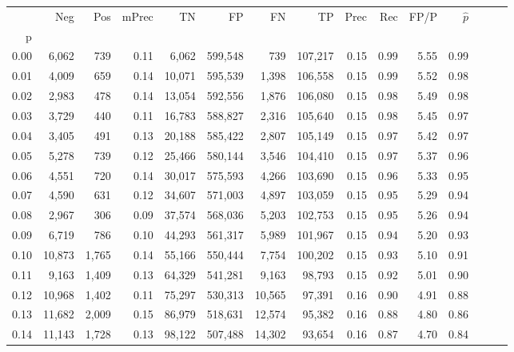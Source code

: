 \begin{tabular}{rrrrrrrrrrrrrrr}
\toprule
{} &     Neg &    Pos & mPrec &       TN &       FP &       FN &       TP &  Prec &   Rec &  FP/P & $\hat{p}$ \\
p    &         &        &       &          &          &          &          &       &       &       &           \\
\midrule
0.00 &   6,062 &    739 &  0.11 &    6,062 &  599,548 &      739 &  107,217 &  0.15 &  0.99 &  5.55 &      0.99 \\
0.01 &   4,009 &    659 &  0.14 &   10,071 &  595,539 &    1,398 &  106,558 &  0.15 &  0.99 &  5.52 &      0.98 \\
0.02 &   2,983 &    478 &  0.14 &   13,054 &  592,556 &    1,876 &  106,080 &  0.15 &  0.98 &  5.49 &      0.98 \\
0.03 &   3,729 &    440 &  0.11 &   16,783 &  588,827 &    2,316 &  105,640 &  0.15 &  0.98 &  5.45 &      0.97 \\
0.04 &   3,405 &    491 &  0.13 &   20,188 &  585,422 &    2,807 &  105,149 &  0.15 &  0.97 &  5.42 &      0.97 \\
0.05 &   5,278 &    739 &  0.12 &   25,466 &  580,144 &    3,546 &  104,410 &  0.15 &  0.97 &  5.37 &      0.96 \\
0.06 &   4,551 &    720 &  0.14 &   30,017 &  575,593 &    4,266 &  103,690 &  0.15 &  0.96 &  5.33 &      0.95 \\
0.07 &   4,590 &    631 &  0.12 &   34,607 &  571,003 &    4,897 &  103,059 &  0.15 &  0.95 &  5.29 &      0.94 \\
0.08 &   2,967 &    306 &  0.09 &   37,574 &  568,036 &    5,203 &  102,753 &  0.15 &  0.95 &  5.26 &      0.94 \\
0.09 &   6,719 &    786 &  0.10 &   44,293 &  561,317 &    5,989 &  101,967 &  0.15 &  0.94 &  5.20 &      0.93 \\
0.10 &  10,873 &  1,765 &  0.14 &   55,166 &  550,444 &    7,754 &  100,202 &  0.15 &  0.93 &  5.10 &      0.91 \\
0.11 &   9,163 &  1,409 &  0.13 &   64,329 &  541,281 &    9,163 &   98,793 &  0.15 &  0.92 &  5.01 &      0.90 \\
0.12 &  10,968 &  1,402 &  0.11 &   75,297 &  530,313 &   10,565 &   97,391 &  0.16 &  0.90 &  4.91 &      0.88 \\
0.13 &  11,682 &  2,009 &  0.15 &   86,979 &  518,631 &   12,574 &   95,382 &  0.16 &  0.88 &  4.80 &      0.86 \\
0.14 &  11,143 &  1,728 &  0.13 &   98,122 &  507,488 &   14,302 &   93,654 &  0.16 &  0.87 &  4.70 &      0.84 \\

\end{tabular}
